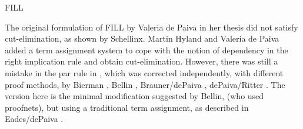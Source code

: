 \begin{entry}{FILL}
\begin{history}
The original formulation of FILL by Valeria de Paiva in her
thesis \cite{dePaiva:1990} did not satisfy cut-elimination, as shown
by Schellinx.  Martin Hyland and Valeria de Paiva \cite{Hyland:1993}
added a term assignment system to cope with the notion of dependency
in the right implication rule and obtain cut-elimination. However,
there was still a mistake in the par rule in \cite{Hyland:1993}, which
was corrected independently, with different proof methods, by Bierman
\cite{Bierman:1996}, Bellin \cite{Bellin:1997}, Brauner/dePaiva \cite{Brauner:1998}, 
dePaiva/Ritter \cite{dePaiva:2006}. The version here is the minimal
modification suggested by Bellin, (who used proofnets), but using a
traditional term assignment, as described in
Eades/dePaiva \cite{Eades:2015}.
\end{history}



%
%
%
%
%
%
% 
%




\end{entry}
